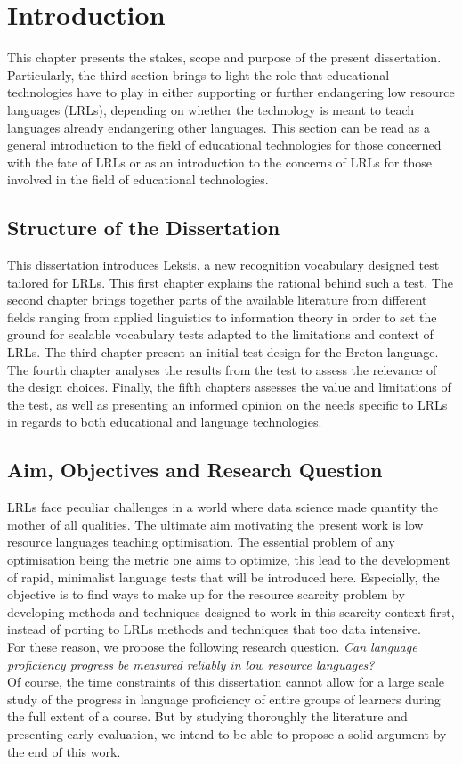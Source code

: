 \chapter{Introduction}    
This chapter presents the stakes, scope and purpose of the present dissertation. Particularly, the third section brings to light the role that educational technologies have to play in either supporting or further endangering low resource languages (LRLs), depending on whether the technology is meant to teach languages already endangering other languages. This section can be read as a general introduction to the field of educational technologies for those concerned with the fate of LRLs or as an introduction to the concerns of LRLs for those involved in the field of educational technologies.

\section{Structure of the Dissertation}
This dissertation introduces Leksis, a new recognition vocabulary designed test tailored for LRLs. This first chapter explains the rational behind such a test. The second chapter brings together parts of the available literature from different fields ranging from applied linguistics to information theory in order to set the ground for scalable vocabulary tests adapted to the limitations and context of LRLs. The third chapter present an initial test design for the Breton language. The fourth chapter analyses the results from the test to assess the relevance of the design choices. Finally, the fifth chapters assesses the value and limitations of the test, as well as presenting an informed opinion on the needs specific to LRLs in regards to both educational and language technologies.

\section{Aim, Objectives and Research Question}
LRLs face peculiar challenges in a world where data science made quantity the mother of all qualities. The ultimate aim motivating the present work is low resource languages teaching optimisation. The essential problem of any optimisation being the metric one aims to optimize, this lead to the development of rapid, minimalist language tests that will be introduced here. Especially, the objective is to find ways to make up for the resource scarcity problem by developing methods and techniques designed to work in this scarcity context first, instead of porting to LRLs methods and techniques that too data intensive.\\
For these reason, we propose the following research question. \textit{Can language proficiency progress be measured reliably in low resource languages?}\\
Of course, the time constraints of this dissertation cannot allow for a large scale study of the progress in language proficiency of entire groups of learners during the full extent of a course. But by studying thoroughly the literature and presenting early evaluation, we intend to be able to propose a solid argument by the end of this work.

